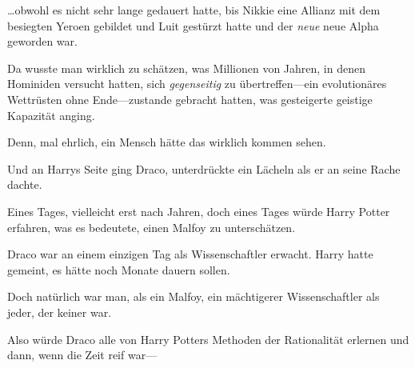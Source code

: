 …obwohl es nicht sehr lange gedauert hatte, bis Nikkie eine Allianz mit dem besiegten Yeroen gebildet und Luit gestürzt hatte und der \emph{neue} neue Alpha geworden war.

Da wusste man wirklich zu schätzen, was Millionen von Jahren, in denen Hominiden versucht hatten, sich \emph{gegenseitig} zu übertreffen—ein evolutionäres Wettrüsten ohne Ende—zustande gebracht hatten, was gesteigerte geistige Kapazität anging.

Denn, mal ehrlich, ein Mensch hätte das wirklich kommen sehen.

\later

Und an Harrys Seite ging Draco, unterdrückte ein Lächeln als er an seine Rache dachte.

Eines Tages, vielleicht erst nach Jahren, doch eines Tages würde Harry Potter erfahren, was es bedeutete, einen Malfoy zu unterschätzen.

Draco war an einem einzigen Tag als Wissenschaftler erwacht. Harry hatte gemeint, es hätte noch Monate dauern sollen.

Doch natürlich war man, als ein Malfoy, ein mächtigerer Wissenschaftler als jeder, der keiner war.

Also würde Draco alle von Harry Potters Methoden der Rationalität erlernen und dann, wenn die Zeit reif war—

